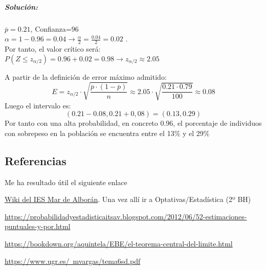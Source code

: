 \subparagraph{Solución:}$\overline{p}=0.21$, Confianza=$96$ \\
$\alpha=1-0.96=0.04 \to \frac{\alpha}{2}=\frac{0.04}{2}=0.02$
. \\ Por tanto, el valor crítico será: \\

$P\left(Z \leqslant z_{\alpha / 2} \right)= 0.96 + 0.02 = 0.98 \to z_{\alpha / 2} \approx 2.05$
 
A partir de la definición de error máximo admitido:
$$E=z_{\alpha / 2}\cdot \sqrt{\frac{\overline{p}\cdot\left(1-\overline{p} \right)}{n}}\approx 2.05 \cdot \sqrt{\frac{0.21\cdot 0.79}{100}}\approx 0.08$$
Luego el intervalo es: \\ 
$$\left( 0.21 - 0.08 , 0.21 + 0,08 \right) = \left(0.13, 0.29 \right)
$$
Por tanto con una alta probabilidad, en concreto 0.96, el porcentaje de individuos con sobrepeso en la población se encuentra entre el 13\% y el 29\% 

\subsection{Referencias}
Me ha resultado útil el siguiente enlace 

\href{http://maralboran.org/wikipedia/index.php/}{Wiki del IES Mar de Alborán}. Una vez allí ir a Optativas/Estadística (2º BH)

\href{https://probabilidadyestadisticaitsav.blogspot.com/2012/06/52-estimaciones-puntuales-y-por.html}{https://probabilidadyestadisticaitsav.blogspot.com/2012/06/52-estimaciones-puntuales-y-por.html}

\href{https://bookdown.org/aquintela/EBE/el-teorema-central-del-limite.html}{https://bookdown.org/aquintela/EBE/el-teorema-central-del-limite.html}

\href{https://www.ugr.es/~mvargas/tema6sd.pdf}{https://www.ugr.es/~mvargas/tema6sd.pdf}



